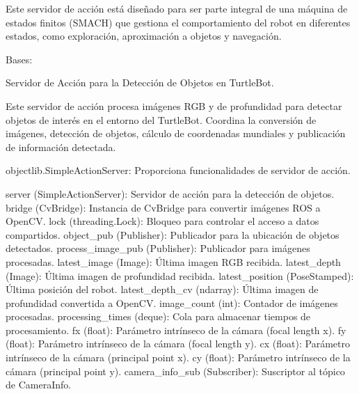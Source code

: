 \documentclass[a4paper,10pt,spanish]{sphinxmanual}
\begin{document}
\sphinxAtStartPar
Este servidor de acción está diseñado para ser parte integral de una máquina de estados finitos
(SMACH) que gestiona el comportamiento del robot en diferentes estados, como exploración,
aproximación a objetos y navegación.

\begin{fulllineitems}
\label{\detokenize{squad_object_detection_action:squad_object_detection_action.TurtleBotObjectDetectionAction}}
\pysigstartsignatures
{}
\pysigstopsignatures
\sphinxAtStartPar
Bases: 

\sphinxAtStartPar
Servidor de Acción para la Detección de Objetos en TurtleBot.

\sphinxAtStartPar
Este servidor de acción procesa imágenes RGB y de profundidad para detectar objetos de interés
en el entorno del TurtleBot. Coordina la conversión de imágenes, detección de objetos, cálculo
de coordenadas mundiales y publicación de información detectada.
\begin{description}
\sphinxAtStartPar
objectlib.SimpleActionServer: Proporciona funcionalidades de servidor de acción.

\sphinxAtStartPar
server (SimpleActionServer): Servidor de acción para la detección de objetos.
bridge (CvBridge): Instancia de CvBridge para convertir imágenes ROS a OpenCV.
lock (threading.Lock): Bloqueo para controlar el acceso a datos compartidos.
object\_pub (Publisher): Publicador para la ubicación de objetos detectados.
process\_image\_pub (Publisher): Publicador para imágenes procesadas.
latest\_image (Image): Última imagen RGB recibida.
latest\_depth (Image): Última imagen de profundidad recibida.
latest\_position (PoseStamped): Última posición del robot.
latest\_depth\_cv (ndarray): Última imagen de profundidad convertida a OpenCV.
image\_count (int): Contador de imágenes procesadas.
processing\_times (deque): Cola para almacenar tiempos de procesamiento.
fx (float): Parámetro intrínseco de la cámara (focal length x).
fy (float): Parámetro intrínseco de la cámara (focal length y).
cx (float): Parámetro intrínseco de la cámara (principal point x).
cy (float): Parámetro intrínseco de la cámara (principal point y).
camera\_info\_sub (Subscriber): Suscriptor al tópico de CameraInfo.


\end{description}
\end{fulllineitems}
\end{document}
